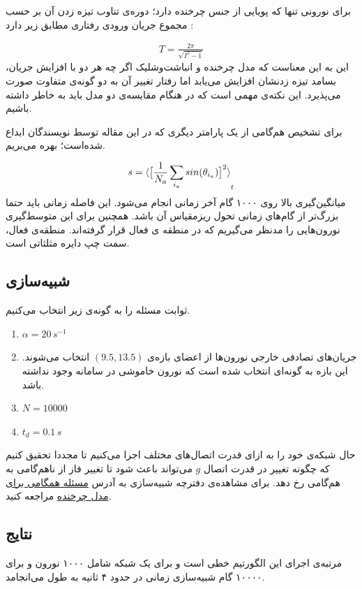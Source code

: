 برای نورونی تنها که پویایی از جنس چرخنده دارد؛ دوره‌ی تناوب تیزه زدن آن بر حسب مجموع جریان ورودی‌ رفتاری مطابق زیر دارد \cite{safaeesirat2020critical}:

\begin{align}
	T = \frac{2\pi}{\sqrt{I^2 - 1}}
\end{align}
این به این معناست که مدل چرخنده و انباشت‌وشلیک اگر چه هر دو با افزایش جریان، بسامد تیزه زدنشان افزایش می‌یابد اما رفتار تغییر آن به دو گونه‌ی متفاوت صورت می‌پذیرد. این نکته‌ی مهمی است که در هنگام مقایسه‌ی دو مدل باید به خاطر داشته باشیم.

برای تشخیص هم‌گامی از یک پارامتر دیگری که در این مقاله \cite{safaeesirat2020critical}  توسط نویسندگان ابداع شده‌است؛ بهره می‌بریم.

\begin{equation}
	s =  \braket{ \big[ \frac{1}{N_a}\sum_{i_a} sin(\theta_{i_a}) \big]^{2}}_t
	\label{eq:saman_amin_param}
\end{equation}
میانگین‌گیری بالا روی ۱۰۰۰ گام آخر زمانی انجام می‌شود. این فاصله زمانی باید حتما بزرگ‌تر از گام‌های زمانی تحول ریزمقیاس آن باشد. همچنین برای این متوسط‌گیری نورون‌هایی را مدنظر می‌گیریم که در منطقه ی فعال قرار گرفته‌اند. منطقه‌ی فعال، سمت چپ دایره مثلثاتی است.
\subsection{شبیه‌سازی}
ثوابت مسئله را به گونه‌ی زیر انتخاب می‌کنیم.
\begin{tcolorbox}[colback=green!5!white,colframe=green!75!black]
	\begin{enumerate}[*]
		\item
		$\alpha = 20\, s^{-1}$
		\item
		جریان‌های تصادفی خارجی نورون‌ها از اعضای بازه‌ی $(9.5,13.5)$ انتخاب می‌شوند. این بازه به گونه‌ای انتخاب شده است که نورون خاموشی در سامانه وجود نداشته باشد.
		\item
		$N = 10000$
		\item
		$t_d = 0.1\, s$ 
	\end{enumerate}
\end{tcolorbox}
حال شبکه‌ی خود را به ازای قدرت اتصال‌های مختلف اجرا می‌کنیم تا مجددا تحقیق کنیم که چگونه تغییر در قدرت اتصال $g$ می‌تواند باعث شود تا تغییر فاز از ناهم‌گامی به هم‌گامی رخ دهد. برای مشاهده‌ی دفترچه شبیه‌سازی به آدرس 
\href{run://..//scripts//rotational_model}{مسئله همگامی برای مدل چرخنده}
مراجعه کنید.

\subsection{نتایج }
مرتبه‌ی اجرای این الگورتیم خطی است و برای یک شبکه شامل ۱۰۰۰ نورون و برای ۱۰۰۰۰ گام شبیه‌سازی زمانی در حدود ۴ ثانیه به طول می‌انجامد. 


